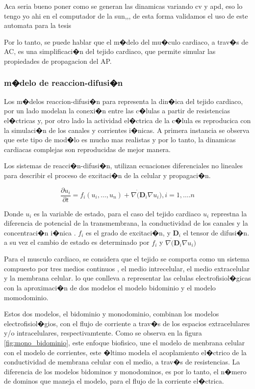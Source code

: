 Aca seria bueno poner como se generan las dinamicas variando cv y apd, eso lo
tengo yo ahi en el computador de la sun,,, de esta forma validamos el uso de
este automata para la tesis

Por lo tanto, se puede hablar que el m�delo del mu�culo cardiaco, a trav�s de
\ac{AC}, es una simplificaci�n del tejido cardiaco, que permite  simular las
propiedades de propagacion del \ac{AP}.


\subsubsection{m�delo de reaccion-difusi�n}

Los m�delos reaccion-difusi�n para representa la din�ica del tejido cardiaco,
por un lado modelan la conexi�n  entre las c�lulas a partir de
resistencias el�ctricas y, por otro lado la actividad el�ctrica de la c�lula es
reproducica con la simulaci�n de los canales  y corrientes i�nicas. A primera
instancia se observa que este tipo de mod�lo es mucho mas realistas y por lo
tanto, la dinamicas cardiacas complejas son reproducidas de mejor manera.

Los sistemas de reacci�n-difusi�n, utilizan ecuaciones diferenciales no lineales
para describir el proceso de excitaci�n de la celular y propagaci�n.

\begin{equation}\label{eq:r-d}
\frac{\partial{u_i}}{\partial{t}}=f_i(u_i, \ldots,u_n) + \nabla \dot
(\mathbf{D}_i \nabla u_i), i=1,\ldots.n
\end{equation}

Donde $u_i$ es la variable de estado, para el caso del tejido cardiaco $u_i$
represtna la diferencia de potencial de la transmembrana, la conductividad de
los canales  y la concentraci�n i�nica \cite{Sachse04}. $f_i$ es el grado de excitaci�n, y
$\mathbf{D}_i$ el tensor de difusi�n. a su vez el cambio de estado es
determinado por $f_i$ y $\nabla \dot(\mathbf{D}_i \nabla u_i)$

Para el musculo cardiaco, se considera que el tejido se comporta
como un sistema compuesto por tres medios continuos \cite{holden1997}, el medio
intrecelular, el medio extracelular y la membrana celular. lo que conlleva a
representar las celulas electrofisiol�gicas con la aproximaci�n de dos modelos
el modelo bidominio y el modelo momodominio.


Estos dos modelos, el bidominio  y monodominio, combinan los
modelos electrofisiol�gios, con el flujo de corriente a trav�s de los espacios
extracelulares y/o intracelulares, respectivamtente. Como se observa en la
figura \ref{fig:mono_bidominio}, este enfoque biofisico, une el modelo de
menbrana celular con el modelo de corrientes, este �ltimo modela el acoplamiento
el�ctrico de la conductividad de membrana celular con el medio, a trav�s de
resistencias. La diferencia de los modelos bidominos y monodominos, es por lo
tanto, el n�mero de dominos que maneja el modelo, para el flujo de la corriente
el�ctrica.

